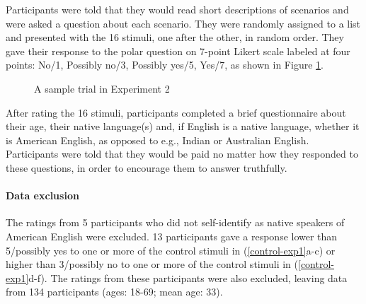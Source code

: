 \documentclass[11pt,fleqn]{article}
\newcommand{\6}{\mbox{$[\hspace*{-.6mm}[$}}
\newcommand{\9}{\mbox{$]\hspace*{-.6mm}]$}}
\begin{document}
Participants were told that they would read short descriptions of scenarios and were asked a question about each scenario. They were randomly assigned to a list and presented with the 16 stimuli, one after the other, in random order. They gave their response to the polar question on 7-point Likert scale labeled at four points: No/1, Possibly
no/3, Possibly yes/5, Yes/7, as shown in Figure \ref{f-trial-exp1}. 

\begin{figure}[h!]
\centering


\caption{A sample trial in Experiment 2}\label{f-trial-exp1}
\end{figure}

After rating the 16 stimuli, participants completed a brief questionnaire about their age, their
native language(s) and, if English is a native language, whether it is
American English, as opposed to e.g., Indian or Australian English.
Participants were told that they would be paid no matter how they
responded to these questions, in order to encourage them to answer
truthfully.


\paragraph{Data exclusion} The ratings from 5 participants who did not self-identify as native speakers of American English were excluded. 13 participants gave a response lower than 5/possibly yes to one or more of the control stimuli in (\ref{control-exp1}a-c) or higher than 3/possibly no to one or more of the control stimuli in (\ref{control-exp1}d-f). The ratings from these participants were also excluded, leaving data from 134 participants (ages: 18-69; mean age: 33).
\end{document}
